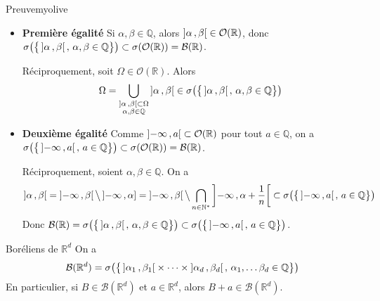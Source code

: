     \begin{demo}{Preuve}{myolive}
        \begin{itemize}
            \item \textbf{Première égalité} \quad Si $\alpha, \beta \in \mathbb{Q}$, alors $\left] \alpha \, , \beta \right[ \in \mathcal{O}(\mathbb{R})$, donc $\sigma\big(\big\{ \left] \alpha \, , \beta \right[, \, \alpha, \beta \in \mathbb{Q} \big\}\big) \subset \sigma(\mathcal{O}(\mathbb{R})) = \mathcal{B}(\mathbb{R})$. 
            
            Réciproquement, soit $\Omega \in \mathcal{O}(\mathbb{R})$. Alors 
            \[ \Omega = \bigcup_{\substack{\left] \alpha \, , \beta \right[ \subset \Omega \\ \alpha,\beta \in \mathbb{Q}}} \left] \alpha \, , \beta \right[ \in \sigma\big(\big\{ \left] \alpha \, , \beta \right[, \, \alpha, \beta \in \mathbb{Q} \big\}\big) \]
            \item \textbf{Deuxième égalité} \quad Comme $\left] -\infty \, , a \right[ \subset \mathcal{O}(\mathbb{R})$ pour tout $a \in \mathbb{Q}$, on a $\sigma\big(\big\{ \left] -\infty \, , a \right[, \, a \in \mathbb{Q} \big\}\big) \subset \sigma(\mathcal{O}(\mathbb{R})) = \mathcal{B}(\mathbb{R})$.
            
            Réciproquement, soient $\alpha,\beta \in \mathbb{Q}$. On a 
            \[ \left] \alpha \, , \beta \right[ = \left] -\infty \, , \beta \right[ \big\backslash \left] -\infty \, , \alpha \right] = \left] -\infty \, , \beta \right[ \big\backslash \bigcap_{n \in \mathbb{N}^*} \left] -\infty \, , \alpha + \frac{1}{n} \right[ \subset \sigma\big(\big\{ \left] -\infty \, , a \right[, \, a \in \mathbb{Q} \big\}\big) \]
            Donc $\mathcal{B}(\mathbb{R}) = \sigma\big(\big\{ \left] \alpha \, , \beta \right[, \, \alpha, \beta \in \mathbb{Q} \big\}\big) \subset \sigma\big(\big\{ \left] -\infty \, , a \right[, \, a \in \mathbb{Q} \big\}\big)$.
        \end{itemize}
    \end{demo}

    \begin{prop}{Boréliens de $\mathbb{R}^d$}{}
        On a 
        \[ \mathcal{B}(\mathbb{R}^d) = \sigma\big( \big\{ \left] \alpha_1 \, , \beta_1 \right[ \times \cdots \times \left] \alpha_d \, , \beta_d \right[, \, \alpha_1,\ldots \beta_d \in \mathbb{Q} \big\} \big) \]   
        En particulier, si $B \in \mathcal{B}(\mathbb{R}^d)$ et $a \in \mathbb{R}^d$, alors $B + a \in \mathcal{B}(\mathbb{R}^d)$.
    \end{prop}

